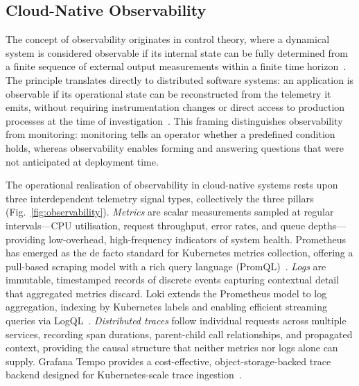 \documentclass[a4paper,anonymous,UKenglish]{lipics-v2021}
\begin{document}
\subsection{Cloud-Native Observability}

The concept of observability originates in control theory, where a dynamical
system is considered observable if its internal state can be fully determined
from a finite sequence of external output measurements within a finite time
horizon~\cite{kosinska2023toward}. The principle translates directly to
distributed software systems: an application is observable if its operational
state can be reconstructed from the telemetry it emits, without requiring
instrumentation changes or direct access to production processes at the time of
investigation~\cite{boten2022cloudnative}. This framing distinguishes
observability from monitoring: monitoring tells an operator whether a
predefined condition holds, whereas observability enables forming and answering
questions that were not anticipated at deployment time.

The operational realisation of observability in cloud-native systems rests upon
three interdependent telemetry signal types, collectively the three
pillars~\cite{boten2022cloudnative, kosinska2023toward}
(Fig.~\ref{fig:observability}). \textit{Metrics} are scalar measurements
sampled at regular intervals---CPU utilisation, request throughput, error
rates, and queue depths---providing low-overhead, high-frequency indicators of
system health. Prometheus has emerged as the de facto standard for Kubernetes
metrics collection, offering a pull-based scraping model with a rich query
language (PromQL)~\cite{prometheus2015}. \textit{Logs} are immutable,
timestamped records of discrete events capturing contextual detail that
aggregated metrics discard. Loki extends the Prometheus model to log
aggregation, indexing by Kubernetes labels and enabling efficient streaming
queries via LogQL~\cite{loki2019}. \textit{Distributed traces} follow
individual requests across multiple services, recording span durations,
parent-child call relationships, and propagated context, providing the causal
structure that neither metrics nor logs alone can supply. Grafana Tempo
provides a cost-effective, object-storage-backed trace backend designed for
Kubernetes-scale trace ingestion~\cite{tempo2022}.
\end{document}
